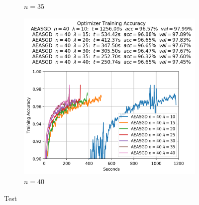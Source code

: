 \begin{figure}
\begin{subfigure}{.3\textwidth}
    \caption{$n = 35$}
  \end{subfigure}
  \begin{subfigure}{.3\textwidth}
    \centering
    \includegraphics[width=\linewidth]{resources/images/aeasgd_experiments_workers_40}
    \caption{$n = 40$}
  \end{subfigure}
  \caption{Test}
  \label{fig:aeasgd_experiments_workers}
\end{figure}

